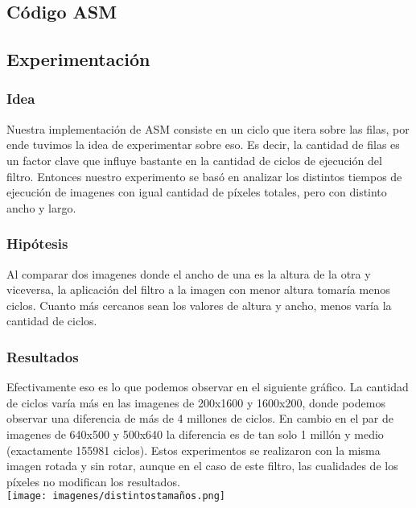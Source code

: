 \subsection{Código ASM}
	
	
	
\subsection{Experimentación}

\subsubsection{Idea}
Nuestra implementación de ASM consiste en un ciclo que itera sobre las filas, por ende tuvimos la idea de experimentar sobre eso. Es decir, la cantidad de filas es un factor clave que influye bastante en la cantidad de ciclos de ejecución del filtro. Entonces nuestro experimento se basó en analizar los distintos tiempos de ejecución de imagenes con igual cantidad de píxeles totales, pero con distinto ancho y largo.
\subsubsection{Hipótesis}
	Al comparar dos imagenes donde el ancho de una es la altura de la otra y viceversa, la aplicación del filtro a la imagen con menor altura tomaría menos ciclos. Cuanto más cercanos sean los valores de altura y ancho, menos varía la cantidad de ciclos.
	
\subsubsection{Resultados}
	Efectivamente eso es lo que podemos observar en el siguiente gráfico. La cantidad de ciclos varía más en las imagenes de 200x1600 y 1600x200, donde podemos observar una diferencia de más de 4 millones de ciclos. En cambio en el par de imagenes de 640x500 y 500x640 la diferencia es de tan solo 1 millón y medio (exactamente 155981 ciclos). Estos experimentos se realizaron con la misma imagen rotada y sin rotar, aunque en el caso de este filtro, las cualidades de los píxeles no modifican los resultados.\\
	\texttt{[image: imagenes/distintostamaños.png]}
	
